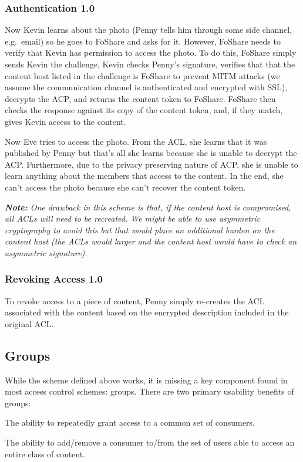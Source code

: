 \documentclass[pdftex,12pt,a4papaer]{article}
\newcommand{\note}[1]{\textit{\textbf{Note:} #1}}
\begin{document}
\subsubsection{Authentication 1.0}

Now Kevin learns about the photo (Penny tells him through some side channel,
e.g.\ email) so he goes to FoShare and asks for it. However, FoShare needs to
verify that Kevin has permission to access the photo. To do this, FoShare simply
sends Kevin the challenge, Kevin checks Penny's signature, verifies that that
the content host listed in the challenge is FoShare to prevent MITM attacks (we
assume the communication channel is authenticated and encrypted with SSL),
decrypts the ACP, and returns the content token to FoShare. FoShare then checks
the response against its copy of the content token, and, if they match, gives
Kevin access to the content.

Now Eve tries to access the photo. From the ACL, she learns that it was
published by Penny but that's all she learns because she is unable to decrypt
the ACP\@. Furthermore, due to the privacy preserving nature of ACP, she is unable
to learn anything about the members that access to the content. In the end, she
can't access the photo because she can't recover the content token.

\note{One drawback in this scheme is that, if the content host is
compromised, all ACLs will need to be recreated. We might be able to use
asymmetric cryptography to avoid this but that would place an additional burden
on the content host (the ACLs would larger and the content host would have to
check an asymmetric signature).}

\subsubsection{Revoking Access 1.0}

To revoke access to a piece of content, Penny simply re-creates the ACL
associated with the content based on the encrypted description included in the
original ACL.

\subsection{Groups}

While the scheme defined above works, it is missing a key component found in
most access control schemes: groups. There are two primary usability benefits of
groups:

\begin{compactenum}
    \item The ability to repeatedly grant access to a common set of consumers.
    \item The ability to add/remove a consumer to/from the set of users able to
        access an entire class of content.
\end{compactenum}
\end{document}
